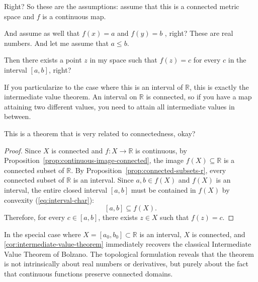 \begin{speech}[00:29:22 - 00:31:05]
Right? So these are the assumptions: assume that this is a connected metric space and $f$ is a continuous map.

And assume as well that $f(x) = a$ and $f(y) = b$ , right? These are real numbers. And let me assume that $a \le b$.

Then there exists a point $z$ in my space  such that $f(z) = c$ for every $c$ in the interval $[a, b]$, right?

If you particularize to the case where this is an interval of $\mathbb{R}$, this is exactly the intermediate value theorem. An interval on $\mathbb{R}$ is connected, so if you have a map attaining two different values, you need to attain all intermediate values in between.

This is a theorem that is very related to connectedness, okay?
\end{speech}

\begin{content}

\begin{proof}
Since $X$ is connected and $f \colon X \to \mathbb{R}$ is continuous, by Proposition~\ref{prop:continuous-image-connected}, the image $f(X) \subseteq \mathbb{R}$ is a connected subset of $\mathbb{R}$.
By Proposition~\ref{prop:connected-subsets-r}, every connected subset of $\mathbb{R}$ is an interval.
Since $a, b \in f(X)$ and $f(X)$ is an interval, the entire closed interval $[a, b]$ must be contained in $f(X)$ by convexity (\eqref{eq:interval-char}):
\[
[a, b] \subseteq f(X).
\]
Therefore, for every $c \in [a, b]$, there exists $z \in X$ such that $f(z) = c$.
\end{proof}

\begin{steps}
In the special case where $X = [a_0, b_0] \subset \mathbb{R}$ is an interval, $X$ is connected, and \cref{cor:intermediate-value-theorem} immediately recovers the classical Intermediate Value Theorem of Bolzano. The topological formulation reveals that the theorem is not intrinsically about real numbers or derivatives, but purely about the fact that continuous functions preserve connected domains.
\end{steps}
\end{content}

